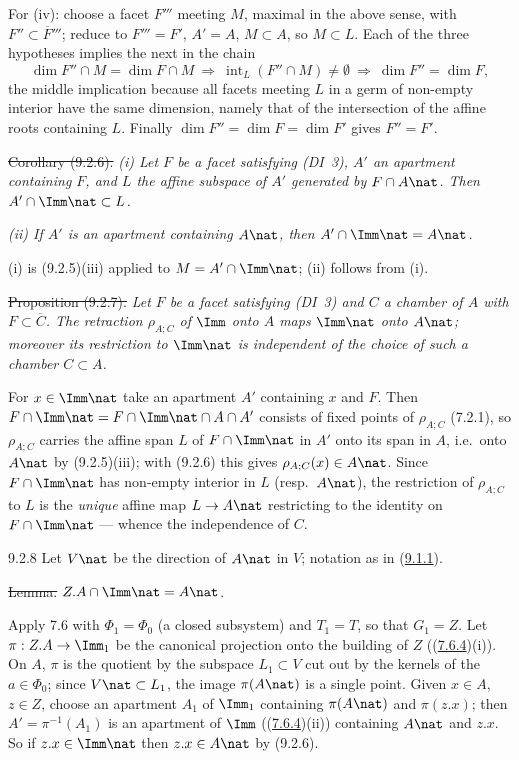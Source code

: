 \documentclass[12pt,a4paper,oneside,english]{smfart}
\makeatletter
\newcommand{\btanchor}[1]{\leavevmode\Hy@raisedlink{\hypertarget{bt:#1}{}}}
\newcommand{\btref}[1]{\hyperlink{bt:#1}{#1}}
\theoremstyle{definition}
\theoremstyle{bt}
\makeatother
\begin{document}
For (iv): choose a facet $F'''$ meeting $M$, maximal in the above sense, with
$F''\subset\overline{F}'''$; reduce to $F'''=F'$, $A'=A$, $M\subset A$, so
$M\subset L$. Each of the three hypotheses implies the next in the chain
\[
\dim F''\cap M=\dim F\cap M
\ \Longrightarrow\
\operatorname{int}_L(F''\cap M)\neq\emptyset
\ \Longrightarrow\
\dim F''=\dim F,
\]
the middle implication because all facets meeting $L$ in a germ of non-empty
interior have the same dimension, namely that of the intersection of the affine
roots containing $L$. Finally $\dim F''=\dim F=\dim F'$ gives $F''=F'$.

\st{Corollary (9.2.6).}
\emph{(i) Let $F$ be a facet satisfying (DI~3), $A'$ an apartment containing
$F$, and $L$ the affine subspace of $A'$ generated by $F\cap A\nat$. Then
$A'\cap\Imm\nat\subset L$.}

\emph{(ii) If $A'$ is an apartment containing $A\nat$, then
$A'\cap\Imm\nat=A\nat$.}

\pf (i) is (9.2.5)(iii) applied to $M=A'\cap\Imm\nat$; (ii) follows from (i).

\st{Proposition (9.2.7).}
\emph{Let $F$ be a facet satisfying (DI~3) and $C$ a chamber of $A$ with
$F\subset\overline C$. The retraction $\rho_{A;C}$ of $\Imm$ onto $A$ maps
$\Imm\nat$ onto $A\nat$; moreover its restriction to $\Imm\nat$ is independent
of the choice of such a chamber $C\subset A$.}

\pf For $x\in\Imm\nat$ take an apartment $A'$ containing $x$ and $F$. Then
$F\cap\Imm\nat=F\cap\Imm\nat\cap A\cap A'$ consists of fixed points of
$\rho_{A;C}$ (7.2.1), so $\rho_{A;C}$ carries the affine span $L$ of
$F\cap\Imm\nat$ in $A'$ onto its span in $A$, i.e.\ onto $A\nat$ by
(9.2.5)(iii); with (9.2.6) this gives $\rho_{A;C}(x)\in A\nat$. Since
$F\cap\Imm\nat$ has non-empty interior in $L$ (resp.\ $A\nat$), the restriction
of $\rho_{A;C}$ to $L$ is the \emph{unique} affine map $L\to A\nat$ restricting
to the identity on $F\cap\Imm\nat$ --- whence the independence of $C$.

\num{9.2.8}\btanchor{9.2.8} Let $V\nat$ be the direction of $A\nat$ in $V$; notation as in (\btref{9.1.1}).

\st{Lemma.} $Z.A\cap\Imm\nat=A\nat$.

\pf Apply 7.6 with $\Phi_1=\Phi_0$ (a closed subsystem) and $T_1=T$, so that
$G_1=Z$. Let $\pi:Z.A\to\Imm_1$ be the canonical projection onto the building of
$Z$ ((\btref{7.6.4})(i)). On $A$, $\pi$ is the quotient by the subspace $L_1\subset V$
cut out by the kernels of the $a\in\Phi_0$; since $V\nat\subset L_1$, the image
$\pi(A\nat)$ is a single point. Given $x\in A$, $z\in Z$, choose an apartment
$A_1$ of $\Imm_1$ containing $\pi(A\nat)$ and $\pi(z.x)$; then
$A'=\pi^{-1}(A_1)$ is an apartment of $\Imm$ ((\btref{7.6.4})(ii)) containing $A\nat$
and $z.x$. So if $z.x\in\Imm\nat$ then $z.x\in A\nat$ by (9.2.6).
\end{document}
